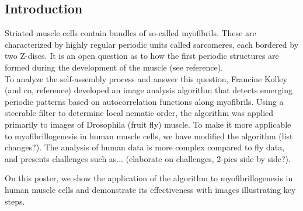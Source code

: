 \documentclass[a1,portrait]{a0poster}
\begin{document}
\begin{multicols}{2} %



\color{SaddleBrown} %

\section*{Introduction}
Striated muscle cells contain bundles of so-called myofibrils. These are characterized by highly regular periodic units called sarcomeres, each bordered by two Z-discs. It is an open question as to how the first periodic structures are formed during the development of the muscle (see reference).\\
To analyze the self-assembly process and answer this question, Francine Kolley (and co, reference) developed an image analysis algorithm that detects emerging periodic patterns based on autocorrelation functions along myofibrils. Using a steerable filter to determine local nematic order, the algorithm was applied primarily to images of Drosophila (fruit fly) muscle. To make it more applicable to myofibrillogenesis in human muscle cells, we have modified the algorithm (list changes?). The analysis of human data is more complex compared to fly data, and presents challenges such as... (elaborate on challenges, 2-pics side by side?).\\
\begin{minipage}{0.45\textwidth}
    \centering
\end{minipage}

On this poster, we show the application of the algorithm to myofibrillogenesis in human muscle cells and demonstrate its effectiveness with images illustrating key steps.


\color{DarkSlateGray} %


\end{multicols}
\end{document}

